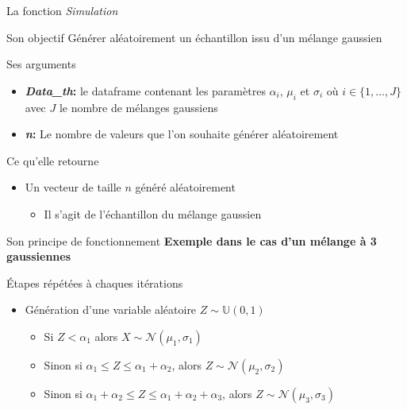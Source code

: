 \documentclass[11pt]{beamer}
\begin{document}
	\begin{frame}{La fonction \textit{Simulation}}
		\begin{block}{Son objectif}
			\small
			Générer aléatoirement un échantillon issu 
			d'un mélange gaussien
		\end{block}
		\begin{block}{Ses arguments}
			\begin{itemize}
				\small
				\item \textbf{\textit{Data\_th}:} le dataframe contenant les paramètres $\alpha_i$, $\mu_i$ et $\sigma_i$ où $i \in \{1, \dots ,J\}$ avec $J$ le nombre de mélanges gaussiens\\
				\item \textbf{\textit{n}:} Le nombre de valeurs que l'on souhaite générer aléatoirement
			\end{itemize}
		\end{block}
		\begin{block}{Ce qu'elle retourne}
			\begin{itemize}
				\small
				\item Un vecteur de taille $n$ généré aléatoirement
				\begin{itemize}
					\item Il s'agit de l'échantillon du mélange gaussien
				\end{itemize}
			\end{itemize}
		\end{block}
	\end{frame}
	\begin{frame}{Son principe de fonctionnement}
		\textbf{Exemple dans le cas d'un mélange à 3 gaussiennes}
		\begin{block}{Étapes répétées à chaques itérations}
			\begin{itemize}
				\item Génération d'une variable aléatoire $Z \sim \mathbb{U}(0,1)$
				\begin{itemize}
					\item Si $Z < \alpha_1$ alors $X \sim \mathcal{N}(\mu_1, \sigma_1)$ \\
					\item Sinon si $\alpha_1 \leq Z \leq \alpha_1 + \alpha_2$, alors $Z \sim \mathcal{N}(\mu_2, \sigma_2)$ \\
					\item Sinon si  $\alpha_1 + \alpha_2 \leq Z \leq \alpha_1 + \alpha_2 + \alpha_3$, alors $Z \sim \mathcal{N}(\mu_3, \sigma_3)$
				\end{itemize}
			\end{itemize}
		\end{block}
	\end{frame}
	
\end{document}
